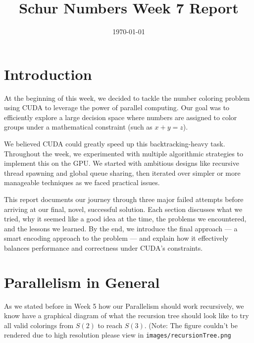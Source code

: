 \documentclass[12pt]{article}
\begin{document}
\title{Schur Numbers Week 7 Report}
\date{\today}

\tableofcontents
\newpage
\maketitle

\section{Introduction}

At the beginning of this week, we decided to tackle the number coloring problem using CUDA to leverage the power of parallel computing. Our goal was to efficiently explore a large decision space where numbers are assigned to color groups under a mathematical constraint (such as \(x + y = z\)).

We believed CUDA could greatly speed up this backtracking-heavy task. Throughout the week, we experimented with multiple algorithmic strategies to implement this on the GPU. We started with ambitious designs like recursive thread spawning and global queue sharing, then iterated over simpler or more manageable techniques as we faced practical issues.

This report documents our journey through three major failed attempts before arriving at our final, novel, successful solution. Each section discusses what we tried, why it seemed like a good idea at the time, the problems we encountered, and the lessons we learned. By the end, we introduce the final approach — a smart encoding approach to the problem — and explain how it effectively balances performance and correctness under CUDA's constraints.


\section{Parallelism in General}

As we stated before in Week 5 how our Parallelism should work recursively, we know have a graphical diagram of what the recursion tree should look like to try all valid colorings from $S(2)$ to reach $S(3)$. (Note: The figure couldn't be rendered due to high resolution please view in \texttt{images/recursionTree.png}
\end{document}
